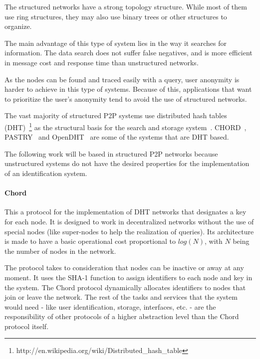The structured networks have a strong topology structure. While most of them
use ring structures, they may also use binary trees or other
structures to organize.

The main advantage of this type of system lies in the way it searches for
information. The data search does not
suffer false negatives, and is more efficient in message cost and response
time than unstructured networks. 

As the nodes can be found and traced easily with a query, user anonymity is harder to
achieve in this type of systems. Because of this, applications that want to
prioritize the user's anonymity tend to avoid the use of structured networks.

The vast majority of structured P2P systems use distributed hash tables
(DHT)~\footnote{http://en.wikipedia.org/wiki/Distributed\_hash\_table} as
the structural basis for the search and storage system~\cite{BalakrishnanEtAl03}.
CHORD~\cite{conf:hotos:DabekBKKMSB01},
PASTRY~\cite{oai:CiteSeerPSU:441779} and 
OpenDHT~\cite{Rhea:2005:OPD:1080091.1080102}
are some of the systems that are DHT based.

The following work will be based in structured P2P networks because unstructured
systems do not have the desired properties for the implementation of an
identification system. 

\paragraph{Chord}
\label{sec:chord}

This a protocol for the implementation of DHT networks that designates a key
for each node. It is designed to work in decentralized networks without the use of
special nodes (like super-nodes to help the realization of queries). Its 
architecture is made to have a basic operational cost proportional to $log(N)$,
with $N$ being the number of nodes in the network.

The protocol takes to consideration that nodes can be inactive or away at any
moment. It uses the SHA-1 function to assign identifiers to each node
and key in the system. The Chord protocol dynamically allocates identifiers to nodes that
join or leave the network. The rest of the tasks and services that the system
would need - like user identification, storage, interfaces, etc. - are the
responsibility of other protocols of a higher abstraction level than the
Chord protocol itself.

